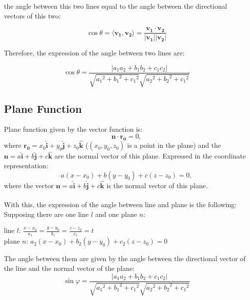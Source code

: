 \documentclass[UTF8,a4paper, 10pt, openany]{svmono}
\begin{document}
the angle between this two lines equal to the angle between the directional vectors of this two:

\[\cos \theta = \langle \mathbf{v_1},\mathbf{v_2} \rangle =\frac{\mathbf{v_1}\cdot \mathbf{v_2}}{|\mathbf{v_1}||\mathbf{v_2}|}\]

Therefore, the expression of the angle between two lines are:

\begin{equation}
\boxed{\cos \theta =\frac{|a_1a_2+b_1b_2+c_1c_2|}{\sqrt{{a_1}^2+{b_1}^2+{c_1}^2}\sqrt{{a_2}^2+{b_2}^2+{c_1}^2}}}
\end{equation}



\subsection{Plane Function}
Plane function given by the vector function is:
\[\mathbf{n}\cdot \mathbf{r_0}=0,\]
where $\mathbf{r_0}=x_0\mathbf{\hat{i}}+y_0\mathbf{\hat{j}}+z_0\mathbf{\hat{k}}$ ($(x_0,y_0,z_0)$ is a point in the plane) and the $\mathbf{n}=a\mathbf{\hat{i}}+b\mathbf{\hat{j}}+c\mathbf{\hat{k}}$ are the normal vector of this plane.
Expressed in the coordinate representation:
\[a(x-x_0)+b(y-y_0)+c(z-z_0)=0,\]
where the vector $\mathbf{n}=a\mathbf{\hat{i}}+b\mathbf{\hat{j}}+c\mathbf{\hat{k}}$ is the normal vector of this plane.\\ \\
With this, the expression of the angle between line and plane is the following:\\
Supposing there are one line $l$ and one plane $n$:
\begin{center}
line $l$: $\frac{x-x_0}{a_1}=\frac{y-y_0}{b_1}=\frac{z-z_0}{c_1}=t$\\
plane $n$: $a_2(x-x_0)+b_2(y-y_0)+c_2(z-z_0)=0$
\end{center}
The angle between them are given by the angle between the directional vector of the line and the normal vector of the plane:
\begin{equation}
\boxed{\sin \varphi =\frac{|a_1a_2+b_1b_2+c_1c_2|}{\sqrt{{a_1}^2+{b_1}^2+{c_1}^2}\sqrt{{a_2}^2+{b_2}^2+{c_1}^2}}}
\end{equation}
\end{document}
